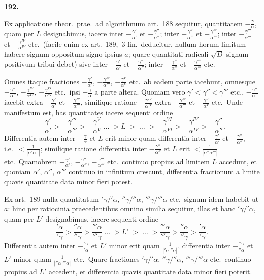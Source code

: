\documentclass[12pt,a4paper]{article}
\theoremstyle{plain}
\begin{document}
\bigskip

\textbf{192.}

Ex applicatione theor.~prae.~ad algorithmum art.~188 sequitur, quantitatem $-\frac{\gamma}{\alpha}$, quam per $L$ designabimus, iacere inter $-\frac{\gamma'}{\alpha'}$ et $-\frac{\gamma''}{\alpha''}$; inter $-\frac{\gamma''}{\alpha''}$ et $-\frac{\gamma'''}{\alpha'''}$; inter $-\frac{\gamma'''}{\alpha'''}$ et $-\frac{\gamma^{IV}}{\alpha^{IV}}$ etc.~(facile enim ex art.~189,~3 fin.~deducitur, nullum horum limitum habere signum oppositum signo ipsius $a$; quare quantitati radicali $\sqrt{D}$ signum positivum tribui debet) sive inter $-\frac{\gamma'}{\alpha'}$ et $-\frac{\gamma''}{\alpha''}$; inter $-\frac{\gamma''}{\alpha''}$ et $-\frac{\gamma'''}{\alpha'''}$ etc.

Omnes itaque fractiones $-\frac{\gamma'}{\alpha'}$, $-\frac{\gamma'''}{\alpha'''}$, $-\frac{\gamma^V}{\alpha^V}$ etc.~ab eadem parte iacebunt, omnesque $-\frac{\gamma''}{\alpha''}$, $-\frac{\gamma^{IV}}{\alpha^{IV}}$, $-\frac{\gamma^{VI}}{\alpha^{VI}}$ etc.~ipsi $-\frac{\gamma}{\alpha}$ a parte altera. Quoniam vero $\gamma' < \gamma'' < \gamma'''$ etc., $-\frac{\gamma''}{\alpha''}$ iacebit extra $-\frac{\gamma'}{\alpha'}$ et $-\frac{\gamma'''}{\alpha'''}$, similique ratione $-\frac{\gamma^{IV}}{\alpha^{IV}}$ extra $-\frac{\gamma'''}{\alpha'''}$ et $-\frac{\gamma^V}{\alpha^V}$ etc.~Unde manifestum est, has quantitates iacere sequenti ordine
\[
-\frac{\gamma'}{\alpha'} > -\frac{\gamma'''}{\alpha'''} > -\frac{\gamma^V}{\alpha^V} \; \ldots \; > L \; > \; \ldots \; > -\frac{\gamma^{VI}}{\alpha^{VI}} > -\frac{\gamma^{IV}}{\alpha^{IV}} > -\frac{\gamma''}{\alpha''}.
\]
Differentia autem inter $-\frac{\gamma}{\alpha}$ et $L$ erit minor quam differentia inter $-\frac{\gamma'}{\alpha'}$ et $-\frac{\gamma''}{\alpha''}$, i.e.~$< \frac{1}{|\alpha'\alpha''|}$; similique ratione differentia inter $-\frac{\gamma''}{\alpha''}$ et $L$ erit $< \frac{1}{|\alpha''\alpha'''|}$ etc.~Quamobrem $-\frac{\gamma'}{\alpha'}$, $-\frac{\gamma''}{\alpha''}$, $-\frac{\gamma'''}{\alpha'''}$ etc.~continuo propius ad limitem $L$ accedunt, et quoniam $\alpha'$, $\alpha''$, $\alpha'''$ continuo in infinitum crescunt, differentia fractionum a limite quavis quantitate data minor fieri potest.

Ex art.~189 nulla quantitatum $'\gamma/'\alpha$, $''\gamma/''\alpha$, $'''\gamma/'''\alpha$ etc.~signum idem habebit ut $a$: hinc per ratiocinia praecedentibus omnino similia sequitur, illas et hanc $'\gamma/'\alpha$, quam per $L'$ designabimus, iacere sequenti ordine
\[
\frac{'\alpha}{'\gamma} > \frac{''\alpha}{''\gamma} > \frac{'''\alpha}{'''\gamma} \; \ldots \; > L' \; > \; \ldots \; > \frac{'''\alpha}{'''\gamma} > \frac{''\alpha}{''\gamma} > \frac{'\alpha}{'\gamma}.
\]
Differentia autem inter $-\frac{'\gamma}{'\alpha}$ et $L'$ minor erit quam $\frac{1}{|'\alpha \; ''\alpha|}$, differentia inter $-\frac{''\gamma}{''\alpha}$ et $L'$ minor quam $\frac{1}{|''\alpha \; '''\alpha|}$ etc.~Quare fractiones $'\gamma/'\alpha$, $''\gamma/''\alpha$, $'''\gamma/'''\alpha$ etc.~continuo propius ad $L'$ accedent, et differentia quavis quantitate data minor fieri poterit.
\end{document}
